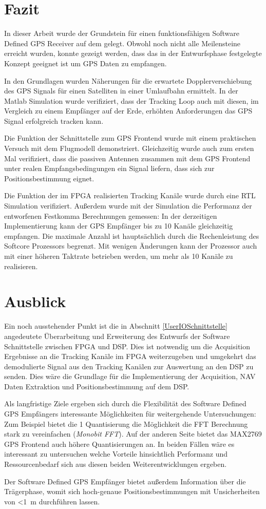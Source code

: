\section{Fazit}
In dieser Arbeit wurde der Grundstein für einen funktionsfähigen Software Defined GPS Receiver auf dem \dscubesat gelegt. Obwohl noch nicht alle Meilensteine erreicht wurden, konnte gezeigt werden, dass das in der Entwurfsphase festgelegte Konzept geeignet ist um GPS Daten zu empfangen.

In den Grundlagen wurden Näherungen für die erwartete Dopplerverschiebung des GPS Signals für einen Satelliten in einer Umlaufbahn ermittelt. In der Matlab Simulation wurde verifiziert, dass der Tracking Loop auch mit diesen, im Vergleich zu einem Empfänger auf der Erde, erhöhten Anforderungen das GPS Signal erfolgreich tracken kann.

Die Funktion der Schnittstelle zum GPS Frontend wurde mit einem praktischen Versuch mit dem \dscubesat Flugmodell demonstriert. Gleichzeitig wurde auch zum ersten Mal verifiziert, dass die passiven Antennen zusammen mit dem GPS Frontend unter realen Empfangsbedingungen ein Signal liefern, dass sich zur Positionsbestimmung eignet.

Die Funktion der im FPGA realisierten Tracking Kanäle wurde durch eine \gls{RTL} Simulation verifiziert. Außerdem wurde mit der Simulation die Performanz der entworfenen Festkomma Berechnungen gemessen: In der derzeitigen Implementierung kann der GPS Empfänger bis zu 10 Kanäle gleichzeitig empfangen. Die maximale Anzahl ist hauptsächlich durch die Rechenleistung des Softcore Prozessors begrenzt. Mit wenigen Änderungen kann der Prozessor auch mit einer höheren Taktrate betrieben werden, um mehr als 10 Kanäle zu realisieren.

\section{Ausblick}
Ein noch ausstehender Punkt ist die in Abschnitt \ref{UserIOSchnittstelle} angedeutete Überarbeitung und Erweiterung des Entwurfs der Software Schnittstelle zwischen FPGA und DSP. Dies ist notwendig um die Acquisition Ergebnisse an die Tracking Kanäle im FPGA weiterzugeben und umgekehrt das demodulierte Signal aus den Tracking Kanälen zur Auswertung an den DSP zu senden. Dies wäre die Grundlage für die Implementierung der Acquisition, NAV Daten Extraktion und Positionsbestimmung auf dem DSP. 

Als langfristige Ziele ergeben sich durch die Flexibilität des Software Defined GPS Empfängers interessante Möglichkeiten für weitergehende Untersuchungen: Zum Beispiel bietet die \SI{1}{\bit} Quantisierung die Möglichkeit die FFT Berechnung stark zu vereinfachen (\emph{Monobit FFT}). Auf der anderen Seite bietet das MAX2769 GPS Frontend auch höhere Quantisierungen an. In beiden Fällen wäre es interessant zu untersuchen welche Vorteile hinsichtlich Performanz und Ressourcenbedarf sich aus diesen beiden Weiterentwicklungen ergeben.

Der Software Defined GPS Empfänger bietet außerdem Information über die Trägerphase, womit sich hoch-genaue Positionsbestimmungen mit Unsicherheiten von \SI{<1}{\meter} durchführen lassen.

